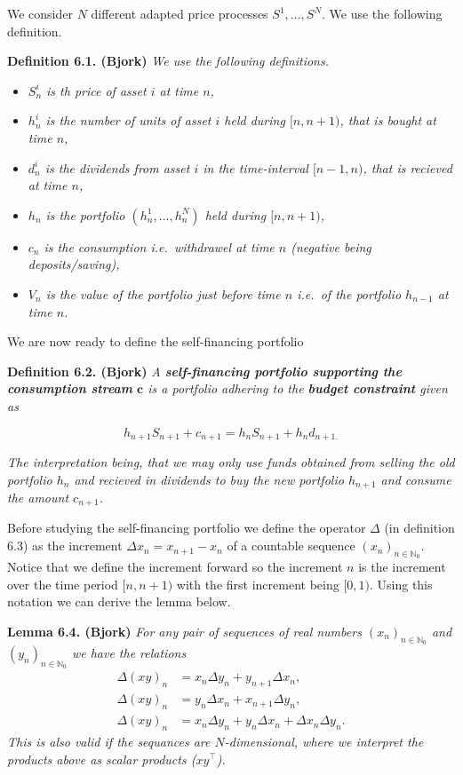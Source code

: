 \documentclass[a4paper,12pt,openany]{book}
\providecommand{\tightlist}{%
 \setlength{\itemsep}{0pt}\setlength{\parskip}{0pt}}
\begin{document}
We consider \(N\) different adapted price processes \(S^1,...,S^N\). We use the following definition.

\textbf{Definition 6.1. (Bjork)} \emph{We use the following definitions.}

\begin{itemize}
\tightlist
\item
  \emph{\(S_n^i\) is th price of asset \(i\) at time \(n\),}
\item
  \emph{\(h_n^i\) is the number of units of asset \(i\) held during \([n,n+1)\), that is bought at time \(n\),}
\item
  \emph{\(d_n^i\) is the dividends from asset \(i\) in the time-interval \([n-1,n)\), that is recieved at time \(n\),}
\item
  \emph{\(h_n\) is the portfolio \((h_n^1,...,h_n^N)\) held during \([n,n+1)\),}
\item
  \emph{\(c_n\) is the consumption i.e.~withdrawel at time \(n\) (negative being deposits/saving),}
\item
  \emph{\(V_n\) is the value of the portfolio just before time \(n\) i.e.~of the portfolio \(h_{n-1}\) at time \(n\).}
\end{itemize}

We are now ready to define the self-financing portfolio

\textbf{Definition 6.2. (Bjork)} \emph{A \textbf{self-financing portfolio supporting the consumption stream} \(\mathbf{c}\) is a portfolio adhering to the \textbf{budget constraint} given as}

\[
h_{n+1}S_{n+1}+c_{n+1}=h_nS_{n+1}+h_nd_{n+1.}
\]

\emph{The interpretation being, that we may only use funds obtained from selling the old portfolio \(h_n\) and recieved in dividends to buy the new portfolio \(h_{n+1}\) and consume the amount \(c_{n+1}\).}

Before studying the self-financing portfolio we define the operator \(\Delta\) (in definition 6.3) as the increment \(\Delta x_n=x_{n+1}-x_n\) of a countable sequence \((x_n)_{n\in\mathbb{N}_0}\). Notice that we define the increment forward so the increment \(n\) is the increment over the time period \([n,n+1)\) with the first increment being \([0,1)\). Using this notation we can derive the lemma below.

\textbf{Lemma 6.4. (Bjork)} \emph{For any pair of sequences of real numbers \((x_n)_{n\in\mathbb{N}_0}\) and \((y_n)_{n\in\mathbb{N}_0}\) we have the relations}
\begin{align*}
\Delta(xy)_n&=x_n\Delta y_n+y_{n+1}\Delta x_n,\tag{6.5}\\
\Delta(xy)_n&=y_n\Delta x_n+x_{n+1}\Delta y_n,\tag{6.6}\\
\Delta(xy)_n&=x_n\Delta y_n+y_n\Delta x_n+\Delta x_n\Delta y_n.\tag{6.7}
\end{align*}
\emph{This is also valid if the sequances are \(N\)-dimensional, where we interpret the products above as scalar products (\(xy^\top\)).}
\end{document}
